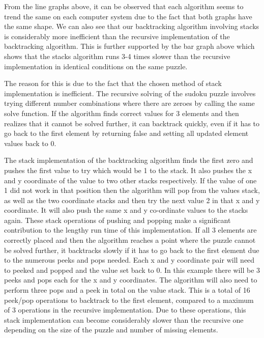 \documentclass[11pt]{article}
\begin{document}
\vspace{3mm}

From the line graphs above, it can be observed that each algorithm seems to trend the same on each computer system due to the fact that both graphs have the same shape. 
We can also see that our backtracking algorithm involving stacks is considerably more inefficient than the recursive implementation of the backtracking algorithm. 
This is further supported by the bar graph above which shows that the stacks algorithm runs 3-4 times slower than the recursive implementation in identical conditions on the same puzzle.\\ 

\vspace{3mm}

The reason for this is due to the fact that the chosen method of stack implementation is inefficient. 
The recursive solving of the sudoku puzzle involves trying different number combinations where there are zeroes by calling the same solve function. 
If the algorithm finds correct values for 3 elements and then realizes that it cannot be solved further, 
it can backtrack quickly, even if it has to go back to the first element by returning false and setting all updated element values back to 0.

\vspace{3mm}

The stack implementation of the backtracking algorithm finds the first zero and pushes the first value to try which would be 1 to the stack. 
It also pushes the x and y coordinate of the value to two other stacks respectively. If the value of one 1 did not work in that position then the algorithm will pop from the values stack, 
as well as the two coordinate stacks and then try the next value 2 in that x and y coordinate. It will also push the same x and y co-ordinate values to the stacks again. 
These stack operations of pushing and popping make a significant contribution to the lengthy run time of this implementation. If all 3 elements are correctly placed and then the algorithm 
reaches a point where the puzzle cannot be solved further, it backtracks slowly if it has to go back to the first element due to the numerous peeks and pops needed. 
Each x and y coordinate pair will need to peeked and popped and the value set back to 0. In this example there will be 3 peeks and pops each for the x and y coordinates. 
The algorithm will also need to perform three pops and a peek in total on the value stack. This is a total of 16 peek/pop operations to backtrack to the first element, 
compared to a maximum of 3 operations in the recursive implementation. Due to these operations, 
this stack implementation can become considerably slower than the recursive one depending on the size of the puzzle and number of missing elements.
\end{document}
